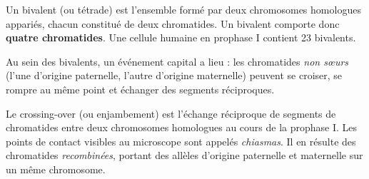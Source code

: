 \documentclass[11pt]{article}
\newcommand{\cle}[1]{{\popxbold\color{popdark}#1}}
\begin{document}
\begin{definition}[Bivalent]
Un \cle{bivalent} (ou tétrade) est l'ensemble formé par deux chromosomes homologues appariés, chacun constitué de deux chromatides. Un bivalent comporte donc \textbf{quatre chromatides}. Une cellule humaine en prophase I contient 23 bivalents.
\end{definition}

Au sein des bivalents, un événement capital a lieu : les chromatides \emph{non sœurs} (l'une d'origine paternelle, l'autre d'origine maternelle) peuvent se croiser, se rompre au même point et échanger des segments réciproques.

\begin{definition}
Le \cle{crossing-over} (ou enjambement) est l'échange réciproque de segments de chromatides entre deux chromosomes homologues au cours de la prophase I. Les points de contact visibles au microscope sont appelés \emph{chiasmas}. Il en résulte des chromatides \emph{recombinées}, portant des allèles d'origine paternelle et maternelle sur un même chromosome.
\end{definition}
\end{document}
